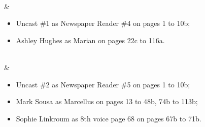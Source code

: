 \\&\begin{itemize}
\item Uncast \#1 as Newspaper Reader \#4 on pages 1 to 10b;
\item Ashley Hughes as Marian on pages 22c to 116a.\end{itemize}
\\&\begin{itemize}
\item Uncast \#2 as Newspaper Reader \#5 on pages 1 to 10b;
\item Mark Sousa as Marcellus on pages 13 to 48b, 74b to 113b;
\item Sophie Linkroum as 8th voice page 68 on pages 67b to 71b.\end{itemize}
\\\hline
